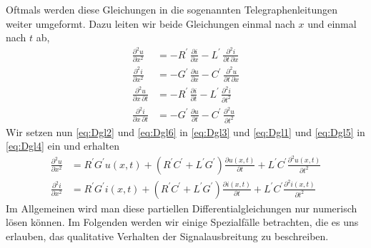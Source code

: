 \documentclass[paper=a4, parskip=half-, ngerman, fontsize=11pt]{scrreprt}
\begin{document}
Oftmals werden diese Gleichungen in die sogenannten Telegraphenleitungen weiter umgeformt. Dazu leiten wir beide
Gleichungen einmal nach $x$ und einmal nach $t$ ab,
\begin{align}
    \frac{\partial^{2} u}{\partial x^2} &= -R^{\prime} \, \frac{\partial i}{\partial x} - L^{\prime} \,
    \frac{\partial^2 i}{\partial t \,
    \partial x} \label{eq:Dgl3} \\[1ex]
    \frac{\partial^{2} i}{\partial x^2} &= -G^{\prime} \, \frac{\partial u}{\partial x} - C^{\prime} \,
    \frac{\partial^2 u}{\partial t \,
    \partial x} \label{eq:Dgl4} \\[1ex]
    \frac{\partial^{2} u}{\partial x \, \partial t} &= -R^{\prime} \, \frac{\partial i}{\partial t} - L^{\prime} \,
    \frac{\partial^2
    i}{\partial t^{2}} \label{eq:Dgl5} \\[1ex]
    \frac{\partial^{2} i}{\partial x \, \partial t} &= -G^{\prime} \, \frac{\partial u}{\partial t} - C^{\prime} \,
    \frac{\partial^2
    u}{\partial t^{2}} \label{eq:Dgl6}
\end{align}
Wir setzen nun \eqref{eq:Dgl2} und \eqref{eq:Dgl6} in \eqref{eq:Dgl3} und \eqref{eq:Dgl1} und \eqref{eq:Dgl5} in
\eqref{eq:Dgl4} ein und erhalten
\begin{align}
    \frac{\partial^{2} u}{\partial x^{2}} &= R^{\prime} G^{\prime} u(x,t) + (R^{\prime} C^{\prime} + L^{\prime}
    G^{\prime}) \frac{\partial u(x, t)}{\partial t} + L^{\prime} C^{\prime} \frac{\partial^{2} u(x,t)}{\partial t^{2}}
     \label{eq:Tele1} \\[1.5ex]
    \frac{\partial^{2} i}{\partial x^{2}} &= R^{\prime} G^{\prime} i(x,t) + (R^{\prime} C^{\prime} + L^{\prime}
    G^{\prime}) \frac{\partial i(x, t)}{\partial t} + L^{\prime} C^{\prime} \frac{\partial^{2} i(x, t)}{\partial t^{2}}
\end{align}
Im Allgemeinen wird man diese partiellen Differentialgleichungen nur numerisch lösen können. Im Folgenden werden wir
einige Spezialfälle betrachten, die es uns erlauben, das qualitative Verhalten der Signalausbreitung zu beschreiben.
\end{document}
